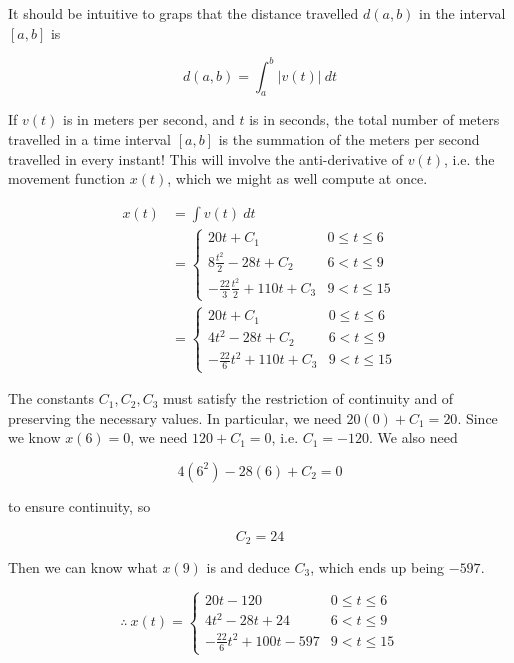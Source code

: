 \documentclass[12pt]{article}
\theoremstyle{definition}
\begin{document}
It should be intuitive to graps that the distance travelled $d(a, b)$ in the interval
$[a, b]$ is

\begin{equation*}
    d(a, b) = \int_a^b |v(t)| ~ dt
\end{equation*}

If $v(t)$ is in meters per second, and $t$ is in seconds, the total number of
meters travelled in a time interval $[a, b]$ is the summation of the meters per
second travelled in every instant! This will involve the anti-derivative of 
$v(t)$, i.e. the movement function $x(t)$, which we might as well compute at
once. 

\begin{align*}
    x(t) 
    &= \int v(t) ~ dt \\ 
    &= \begin{cases}
        20t + C_1 & 0 \leq t \leq 6 \\ 
        8\frac{t^2}{2} - 28t + C_2 & 6 < t \leq 9 \\ 
        -\frac{22}{3} \frac{t^2}{2} + 110t + C_3 & 9 < t \leq 15
    \end{cases} \\ 
    &= \begin{cases}
        20t + C_1 & 0 \leq t \leq 6 \\ 
        4t^2 - 28t + C_2  & 6 < t \leq 9 \\ 
        -\frac{22}{6} t^2 + 110t + C_3& 9 < t \leq 15
    \end{cases}
\end{align*}

The constants $C_1, C_2, C_3$ must satisfy the restriction of continuity and of
preserving the necessary values. In particular, we need $20(0) + C_1 = 20$.
Since we know $x(6) = 0$, we need $120 + C_1 = 0$, i.e. $C_1 = -120$. We also
need 

\begin{equation*}
    4(6^2) - 28(6) + C_2 = 0
\end{equation*}

to ensure continuity, so

\begin{equation*}
    C_2 = 24
\end{equation*}

Then we can know what $x(9)$ is and deduce $C_3$, which ends up being $-597$.

\begin{equation*}
    \therefore ~ x(t) = \begin{cases}
        20t - 120 & 0 \leq t \leq 6 \\ 
        4t^2 -28t + 24 & 6 < t \leq 9 \\ 
        -\frac{22}{6}t^2 +100t - 597 & 9 < t \leq 15
    \end{cases}
\end{equation*}
\end{document}

